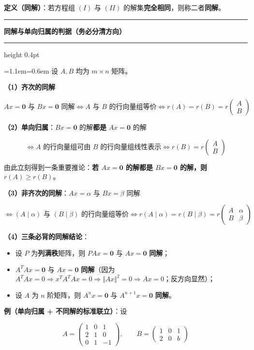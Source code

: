 \documentclass[11pt,openany,UTF8]{ctexbook}
\newcommand{\callouthead}[2]{%
  \par\addvspace{7pt}\noindent
  {\color{#1}\rule[-0.15em]{3pt}{1.05em}}\hspace{0.5em}%
  {\bfseries\color{#1}#2}\par\nobreak\vspace{-0.35em}%
  {\color{rulesep}\hrule height 0.4pt}\nobreak\vspace{0.45em}%
  \begingroup\small\setlength{\parindent}{0pt}%
  \leftskip=1.1em\rightskip=0.6em\noindent\ignorespaces}
\newcommand{\calloutend}{\par\endgroup\addvspace{7pt}}
\newenvironment{callkey}[1]{\callouthead{keybar}{#1}}{\calloutend}
\begin{document}
\textbf{定义（同解）}：若方程组 $(I)$ 与 $(II)$ 的解集\textbf{完全相同}，则称二者\textbf{同解}。

\begin{callkey}{同解与单向归属的判据（务必分清方向）}
设 $A,B$ 均为 $m\times n$ 矩阵。

\textbf{（1）齐次的同解}

\[Ax=\mathbf{0}\text{ 与 }Bx=\mathbf{0}\text{ 同解}
\iff A\text{ 与 }B\text{ 的行向量组等价}
\iff r(A)=r(B)=r\begin{pmatrix} A \\ B \end{pmatrix}\]

\textbf{（2）单向归属}：$Bx=\mathbf{0}$ 的解\textbf{都是} $Ax=\mathbf{0}$ 的解

\[\iff A\text{ 的行向量组可由 }B\text{ 的行向量组线性表示}
\iff r(B)=r\begin{pmatrix} A \\ B \end{pmatrix}\]

由此立刻得到一条重要推论：\textbf{若 $Ax=\mathbf{0}$ 的解都是 $Bx=\mathbf{0}$ 的解，则 $r(A)\ge r(B)$}。

\textbf{（3）非齐次的同解}：$Ax=\alpha$ 与 $Bx=\beta$ 同解

\[\iff (A\mid\alpha)\text{ 与 }(B\mid\beta)\text{ 的行向量组等价}
\iff r(A\mid\alpha)=r(B\mid\beta)=r\begin{pmatrix} A & \alpha \\ B & \beta \end{pmatrix}\]

\textbf{（4）三条必背的同解结论}：

\begin{itemize}
\item 设 $P$ 为\textbf{列满秩}矩阵，则 $PAx=\mathbf{0}$ 与 $Ax=\mathbf{0}$ \textbf{同解}；
\item $A^TAx=\mathbf{0}$ 与 $Ax=\mathbf{0}$ \textbf{同解}（因为 $A^TAx=0\Rightarrow x^TA^TAx=0\Rightarrow\Vert Ax\Vert^2=0\Rightarrow Ax=0$；反方向显然）；
\item 设 $A$ 为 $n$ 阶矩阵，则 $A^nx=\mathbf{0}$ 与 $A^{n+1}x=\mathbf{0}$ \textbf{同解}。
\end{itemize}
\end{callkey}

\textbf{例（单向归属 + 不同解的标准联立）}：设

\[A=\begin{pmatrix} 1 & 0 & 1 \\ 2 & 1 & 0 \\ 0 & 1 & -1 \end{pmatrix},\qquad
B=\begin{pmatrix} 1 & 0 & 1 \\ 2 & 0 & b \end{pmatrix}\]
\end{document}
